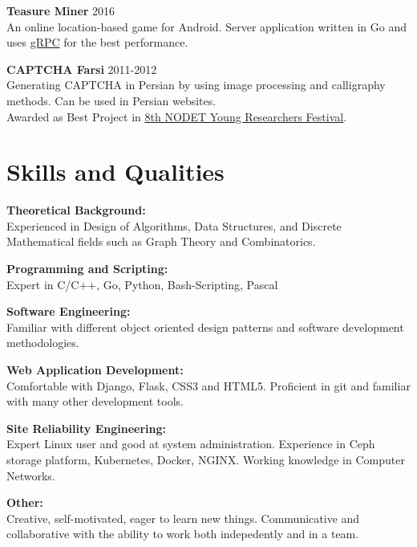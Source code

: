 \documentclass[margin]{res}
\begin{document}
\begin{resume}
	{\bf Teasure Miner} \hfill 2016
	\\An online location-based game for Android. Server application written in Go and uses \href{https://grpc.io/}{gRPC} for the best performance.
	
	{\bf CAPTCHA Farsi} \hfill 2011-2012
	\\Generating CAPTCHA in Persian by using image processing and calligraphy methods. Can be used in Persian websites.
	\\Awarded as Best Project in \href{
	http://www.helli.ir/portal/content/تقدیر-از-دانش-آموزان-برترپژوهشگر	
	}{8th NODET Young Researchers Festival}.

\section{Skills and Qualities} 
    {\bf Theoretical Background:}
    \\Experienced in Design of Algorithms, Data Structures, and Discrete Mathematical fields such as Graph Theory and Combinatorics.

	{\bf Programming and Scripting:}
	\\Expert in C/C++, Go, Python, Bash-Scripting, Pascal

    {\bf Software Engineering:}
    \\Familiar with different object oriented design patterns and software development methodologies.

	{\bf Web Application Development:}
	\\Comfortable with Django, Flask, CSS3 and HTML5. Proficient in git and familiar with many other development tools.

	{\bf Site Reliability Engineering:}
	\\Expert Linux user and good at system administration.
	Experience in Ceph storage platform, Kubernetes, Docker, NGINX.
	Working knowledge in Computer Networks.

	{\bf Other:}
	\\Creative, self-motivated, eager to learn new things. Communicative and collaborative with the ability to work both indepedently and in a team.

\end{resume}
\end{document}
